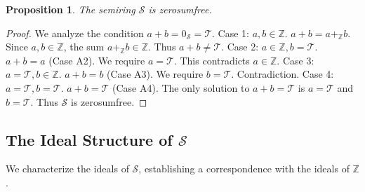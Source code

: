 \documentclass[11pt, a4paper]{article}
\theoremstyle{plain}
\newtheorem{proposition}[theorem]{Proposition}
\theoremstyle{definition}
\numberwithin{equation}{section}
\newcommand{\Z}{\mathbb{Z}}
\newcommand{\Tobj}{\mathcal{T}} %
\newcommand{\SemiringS}{\mathcal{S}}
\begin{document}
\begin{proposition}\label{prop:zerosumfree}
The semiring $\SemiringS$ is zerosumfree.
\end{proposition}
\begin{proof}
We analyze the condition $a+b=0_{\SemiringS}=\Tobj$.
Case 1: $a, b \in \Z$. $a+b = a+_{\Z} b$. Since $a, b \in \Z$, the sum $a+_{\Z} b \in \Z$. Thus $a+b \neq \Tobj$.
Case 2: $a \in \Z, b=\Tobj$. $a+b=a$ (Case A2). We require $a=\Tobj$. This contradicts $a \in \Z$.
Case 3: $a=\Tobj, b \in \Z$. $a+b=b$ (Case A3). We require $b=\Tobj$. Contradiction.
Case 4: $a=\Tobj, b=\Tobj$. $a+b=\Tobj$ (Case A4).
The only solution to $a+b=\Tobj$ is $a=\Tobj$ and $b=\Tobj$. Thus $\SemiringS$ is zerosumfree.
\end{proof}

\subsection{The Ideal Structure of $\SemiringS$}

We characterize the ideals of $\SemiringS$, establishing a correspondence with the ideals of $\Z$.
\end{document}
